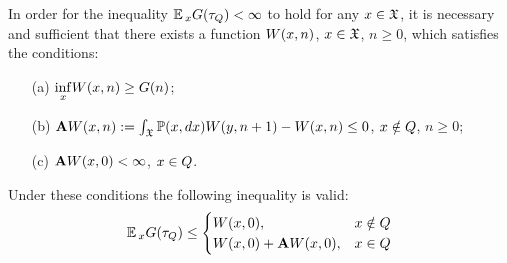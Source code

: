 	\begin{theorem*}
		In order for the inequality $\operatorname*{\mathbb{E}}{}_{x}G(\tau_{Q}) < \infty$ to hold for any $x \in \mathfrak{X}$, it is necessary and sufficient that there exists a function $W(x, n)$, $x \in \mathfrak{X}$, $n \geq 0$, which satisfies the conditions:
		\begin{enumerate}
			\item[(a)] $\underset{x}{\inf}W(x, n) \geq G(n)$;
			\item[(b)] $\mathbf{A}W(x, n) := \int_{\mathfrak{X}}\operatorname*{\mathbb{P}}(x, dx)W(y, n+1) - W(x, n) \leq 0$, $x \notin Q$, $n \geq 0$;
			\item[(c)] $\mathbf{A}W(x, 0) < \infty$, $x \in Q$.
		\end{enumerate}
		Under these conditions the following inequality is valid:
		\begin{gather}
		\operatorname*{\mathbb{E}}{}_{x}G(\tau_{Q}) \leq \begin{cases}
		W(x, 0), & x \notin Q \\
		W(x, 0) + \mathbf{A}W(x, 0), & x \in Q
		\end{cases}
		\label{main_G_W_inequality}
		\end{gather}
	\end{theorem*}
	
